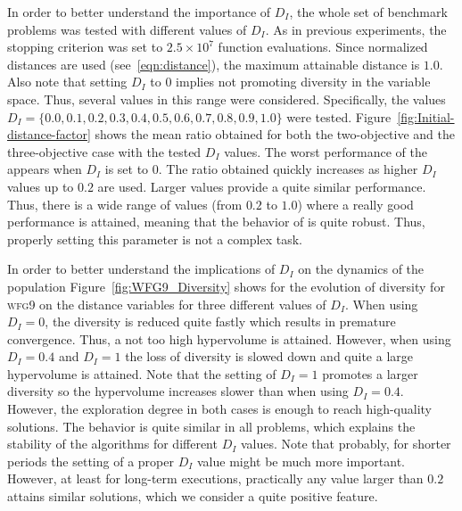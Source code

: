 In order to better understand the importance of $D_I$, the whole set of benchmark problems was tested with different values
of $D_I$.
%
As in previous experiments, the stopping criterion was set to $2.5 \times 10^7$ function evaluations.
%
Since normalized distances are used (see~\ref{eqn:distance}), the maximum attainable distance is $1.0$.
%
Also note that setting $D_I$ to $0$ implies not promoting diversity in the variable space.
%
Thus, several values in this range were considered.
%
Specifically, the values $D_I = \{0.0, 0.1, 0.2, 0.3, 0.4, 0.5, 0.6, 0.7, 0.8, 0.9, 1.0\}$ were tested.
%
Figure~\ref{fig:Initial-distance-factor} shows the mean \HV{} ratio obtained for both the two-objective 
and the three-objective case with the tested $D_I$ values.
%
The worst performance of the \AVSDMOEAD{} appears when $D_I$ is set to $0$.
%
The \HV{} ratio obtained quickly increases as higher $D_I$ values up to $0.2$ are used.
%
Larger values provide a quite similar performance.
%
Thus, there is a wide range of values (from $0.2$ to $1.0$) where a really good performance is attained, 
meaning that the behavior of \AVSDMOEAD{} is quite robust.
%
Thus, properly setting this parameter is not a complex task.

In order to better understand the implications of $D_I$ on the dynamics of the population Figure~\ref{fig:WFG9_Diversity}
shows for \AVSDMOEAD{} the evolution of diversity for \textsc{wfg9} on the distance variables for three different values of $D_I$.
%
When using $D_I = 0$, the diversity is reduced quite fastly which results in premature convergence.
%
Thus, a not too high hypervolume is attained.
%
However, when using $D_I = 0.4$ and $D_I = 1$ the loss of diversity is slowed down and quite a large hypervolume
is attained.
%
Note that the setting of $D_I = 1$ promotes a larger diversity so the hypervolume increases slower than when using
$D_I = 0.4$.
%
However, the exploration degree in both cases is enough to reach high-quality solutions.
%
The behavior is quite similar in all problems, which explains the stability of the algorithms for
different $D_I$ values.
%
Note that probably, for shorter periods the setting of a proper $D_I$ value might be much more important.
%
However, at least for long-term executions, practically any value larger than $0.2$ attains similar solutions,
which we consider a quite positive feature.


